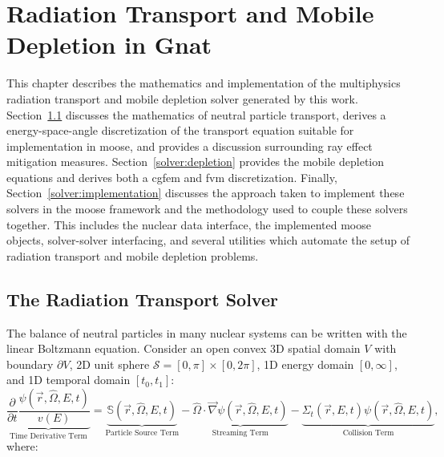 \chapter{Radiation Transport and Mobile Depletion in Gnat} 
\label{solver}

This chapter describes the mathematics and implementation of the multiphysics radiation transport and mobile depletion solver generated by this work. Section~\ref{solver:radiation_transport} discusses the mathematics of neutral particle transport, derives a energy-space-angle discretization of the transport equation suitable for implementation in \acrshort{moose}, and provides a discussion surrounding ray effect mitigation measures. Section~\ref{solver:depletion} provides the mobile depletion equations and derives both a \acrshort{cgfem} and \acrshort{fvm} discretization. Finally, Section~\ref{solver:implementation} discusses the approach taken to implement these solvers in the \acrshort{moose} framework and the methodology used to couple these solvers together. This includes the nuclear data interface, the implemented \acrshort{moose} objects, solver-solver interfacing, and several utilities which automate the setup of radiation transport and mobile depletion problems. 

\section{The Radiation Transport Solver}
\label{solver:radiation_transport}

The balance of neutral particles in many nuclear systems can be written with the linear Boltzmann equation. Consider an open convex 3D spatial domain $V$ with boundary $\partial V$, 2D unit sphere $\mathcal{S} = [0, \pi] \times [0, 2\pi]$, 1D energy domain $[0, \infty]$, and 1D temporal domain $[t_{0}, t_{1}]$:
\begin{equation}\label{eq:generic_transport_equation}
    \underbrace{\frac{\partial}{\partial t}\frac{\psi(\vec{r}, \hat{\Omega}, E, t)}{v(E)}}_{\text{Time Derivative Term}}
    = \underbrace{\mathbb{S}(\vec{r}, \hat{\Omega}, E, t)}_{\text{Particle Source Term}} 
    - \underbrace{\hat{\Omega}\cdot\vec{\nabla}\psi(\vec{r}, \hat{\Omega}, E, t) }_{\text{Streaming Term}}  
    - \underbrace{\Sigma_{t}(\vec{r}, E, t)\psi(\vec{r}, \hat{\Omega}, E, t)}_{\text{Collision Term}} \text{,}
\end{equation}
where:

